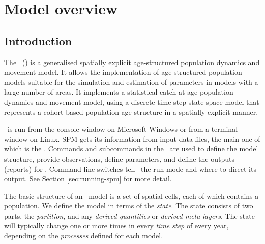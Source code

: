 \section{Model overview\label{sec:overview}}

\subsection{Introduction}

The \SPMName\ (\SPM) is a generalised spatially explicit age-structured population dynamics and movement model. It allows the implementation of age-structured population models suitable for the simulation and estimation of parameters in models with a large number of areas. It implements a statistical catch-at-age population dynamics and movement model, using a discrete time-step state-space model that represents a cohort-based population age structure in a spatially explicit manner. 

\SPM\ is run from the console window on Microsoft Windows or from a terminal window on Linux. SPM gets its information from input data files, the main one of which is
the \config. Commands and subcommands in the \config\ are used to define the model structure, provide observations, define parameters, and define the outputs (reports) for \SPM. Command line switches tell \SPM\ the run mode and where to direct its output. See Section \ref{sec:running-spm} for more detail.

The basic structure  of an \SPM\ model is a set of spatial cells, each of which contains a population. We define the model in terms of the \emph{state}. The state consists of two parts, the \emph{partition}, and any \emph{derived quantities} or \emph{derived meta-layers}. The state will typically change one or more times in every \emph{time step} of every year, depending on the \emph{processes} defined for each model. 

